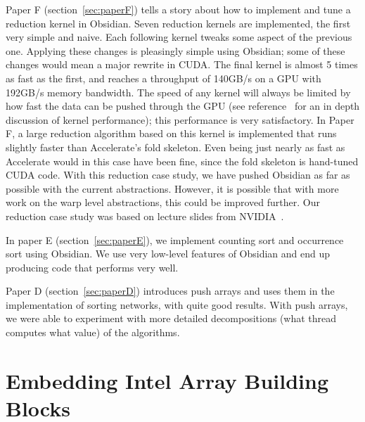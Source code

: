 \documentclass[a4paper]{book}
\begin{document}
Paper F (section~\ref{sec:paperF}) tells a story about how to implement and tune 
a reduction kernel in Obsidian. Seven reduction kernels are implemented, the first 
very simple and naive. Each following kernel tweaks some aspect of the previous one. 
Applying these changes is pleasingly simple using Obsidian; some of these changes 
would mean a major rewrite in CUDA. The final kernel is almost 5 times as fast as the first, 
and reaches a throughput of 140GB/s on a GPU with 192GB/s memory bandwidth. The speed of any 
kernel will always be limited by how fast the data can be pushed through the GPU
(see reference~\citet{merrill} for an in depth discussion of kernel performance); this performance 
is very satisfactory. In Paper F, a large reduction algorithm based on this kernel is 
implemented that runs slightly faster than Accelerate's fold skeleton. Even being just nearly 
as fast as Accelerate would in this case have been fine, since the fold skeleton is hand-tuned 
CUDA code. With this reduction case study, we have pushed Obsidian as far as possible 
with the current abstractions. However, it is possible that with more work on the warp 
level abstractions, this could be improved further. Our reduction case study was based 
on lecture slides from NVIDIA~\citet{reduction}.

In paper E (section~\ref{sec:paperE}), we implement counting sort and occurrence sort 
using Obsidian. We use very low-level features of Obsidian and end up producing 
code that performs very well. 

Paper D (section~\ref{sec:paperD}) introduces push arrays and uses them in the 
implementation of sorting networks, with quite good results. With push arrays, we 
were able to experiment with more detailed decompositions (what thread computes 
what value) of the algorithms. 

\FloatBarrier 
%
%
\section{Embedding Intel Array Building Blocks} 
\end{document}
